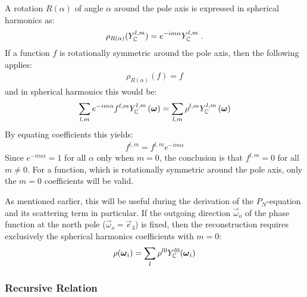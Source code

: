 A rotation $R(\alpha)$ of angle $\alpha$ around the pole axis is expressed in spherical harmonics as:
\begin{align*}
\rho_{R(\alpha)}(Y_{\mathbb{C}}^{l,m}) = e^{-i m\alpha}Y_{\mathbb{C}}^{l,m}
\ .
\end{align*}
If a function $f$ is rotationally symmetric around the pole axis, then the following applies:
\begin{align*}
\rho_{R(\alpha)}(f) = f
\end{align*}
and in spherical harmonics this would be:
\begin{align*}
\sum_{l,m}
{
e^{-i m\alpha}
f^{l,m}
Y_{\mathbb{C}}^{l,m} }\left(\boldsymbol{\mathbf{\omega}}\right)
=
\sum_{l,m}
{
\rho^{l,m}
Y_{\mathbb{C}}^{l,m}\left(\boldsymbol{\mathbf{\omega}}\right)
}
\end{align*}
By equating coefficients this yields:
\begin{align*}
f^{l,m} = f^{l,m}e^{-i m\alpha}
\end{align*}
Since $e^{-i m\alpha}=1$ for all $\alpha$ only when $m=0$, the conclusion is that $f^{l,m} = 0$ for all $m\ne0$. For a function, which is rotationally symmetric around the pole axis, only the $m=0$ coefficients will be valid.

As mentioned earlier, this will be useful during the derivation of the $P_N$-equation and its scattering term in particular. If the outgoing direction $\vec{\omega}_o$ of the phase function at the north pole ($\vec{\omega}_o=\vec{e}_3$) is fixed, then the reconstruction requires exclusively the spherical harmonics coefficients with $m=0$:
\begin{align}
\label{eq:sh_exp_phase}
\rho(\boldsymbol{\mathbf{\omega}}_i) =
\sum_l
{
\rho^{l0}
Y_{\mathbb{C}}^{l0}(\boldsymbol{\mathbf{\omega}}_i)
}
\end{align}

\subsubsection*{Recursive Relation}


